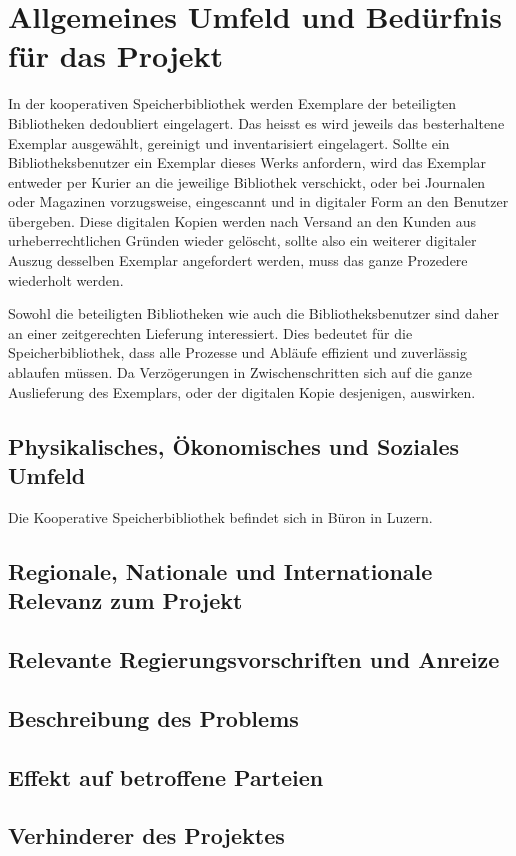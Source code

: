 \chapter{Allgemeines Umfeld und Bedürfnis für das Projekt}
In der kooperativen Speicherbibliothek werden Exemplare der beteiligten Bibliotheken dedoubliert eingelagert. Das heisst es wird jeweils das besterhaltene Exemplar ausgewählt, gereinigt und inventarisiert eingelagert. Sollte ein Bibliotheksbenutzer ein Exemplar dieses Werks anfordern, wird das Exemplar entweder per Kurier an die jeweilige Bibliothek verschickt, oder bei Journalen oder Magazinen vorzugsweise, eingescannt und in digitaler Form an den Benutzer übergeben. Diese digitalen Kopien werden nach Versand an den Kunden aus urheberrechtlichen Gründen wieder gelöscht, sollte also ein weiterer digitaler Auszug desselben Exemplar angefordert werden, muss das ganze Prozedere wiederholt werden.

Sowohl die beteiligten Bibliotheken wie auch die Bibliotheksbenutzer sind daher an einer zeitgerechten Lieferung interessiert. Dies bedeutet für die Speicherbibliothek, dass alle Prozesse und Abläufe effizient und zuverlässig ablaufen müssen. Da Verzögerungen in Zwischenschritten sich auf die ganze Auslieferung des Exemplars, oder der digitalen Kopie desjenigen, auswirken.

\section{Physikalisches, Ökonomisches und Soziales Umfeld}
Die Kooperative Speicherbibliothek befindet sich in Büron in Luzern.


\section{Regionale, Nationale und Internationale Relevanz zum Projekt}

\section{Relevante Regierungsvorschriften und Anreize}

\section{Beschreibung des Problems}

\section{Effekt auf betroffene Parteien}

\section{Verhinderer des Projektes}
